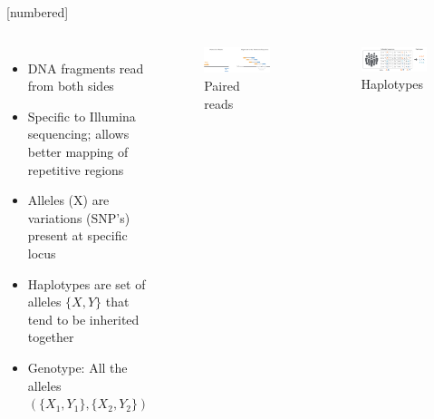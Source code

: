 \documentclass{beamer}
\begin{document}
[numbered]
\begin{frame}[t]{}
	\begin{columns}
		\begin{itemize}
			\item DNA fragments read from both sides
			\item Specific to Illumina sequencing; allows better mapping of repetitive regions 
			\item Alleles (X) are variations (SNP's) present at specific locus
			\item Haplotypes are set of alleles $\{X, Y\}$ that tend to be inherited together
			\item Genotype: All the alleles $(\{X_1, Y_1\}, \{X_2, Y_2\})$
		\end{itemize}
		                
		\begin{figure}
			\centering
			\includegraphics[width=\textwidth,height=0.3\textheight,keepaspectratio]{pairs.png}
			\caption{Paired reads \cite{PairedEndVsSingleRead}}
		\end{figure}
		\begin{figure}
			\centering
			\includegraphics[width=\textwidth,height=0.5\textheight,keepaspectratio]{haplo.png}
			\caption{Haplotypes \cite{AlleleVsGenotype}}
		\end{figure}
	\end{columns}
\end{frame}
\end{document}

